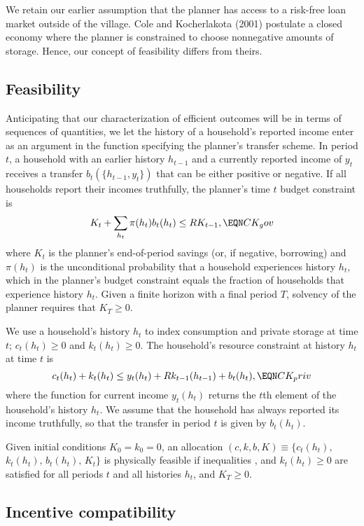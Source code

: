 We retain our earlier assumption that the planner
has access to a risk-free loan market outside of the village.
Cole and Kocherlakota (2001) postulate a closed economy where the planner
is constrained to choose nonnegative amounts of storage.
Hence, our concept of feasibility  differs from theirs.



\subsection{Feasibility}

Anticipating that our characterization of efficient outcomes will
be in terms of sequences of quantities, we let the history of
a household's reported income enter as an argument in the
function specifying the planner's transfer scheme.
In period $t$, a household with an earlier
history $h_{t-1}$ and a currently reported income of
$y_t$ receives a transfer  $b_t(\{h_{t-1},y_t\})$ that can
be either positive or negative. If all households report their
incomes truthfully, the planner's time $t$ budget constraint is
$$
K_t + \sum_{h_t} \pi(h_t) b_t(h_t) \leq R K_{t-1},  \EQN CK_gov
$$
where $K_t$ is the planner's end-of-period savings (or, if
negative, borrowing) and
$\pi(h_t)$ is the unconditional probability that a household
experiences history $h_t$, which in the planner's budget
constraint equals the fraction of  households that
experience history $h_t$. Given a finite horizon with a final
period $T$, solvency of the planner requires that $K_T\geq 0$.

We use a household's history $h_t$ to index consumption
and private storage at time $t$; $c_t(h_t)\geq 0$ and $k_t(h_t)\geq 0$. The
household's resource constraint at history $h_t$ at  time $t$  is
$$
c_t(h_t) + k_t(h_t) \leq y_t(h_t) + R k_{t-1}(h_{t-1}) + b_t(h_t), \EQN CK_priv
$$
where the function for current income $y_t(h_t)$ returns the $t$th
element of the household's history $h_t$. We assume that the
household has always reported its income truthfully, so that the transfer
in period $t$ is given by $b_t(h_t)$.

Given initial conditions $K_0=k_0=0$, an allocation
$(c,k,b,K)\equiv\{c_t(h_t),$\hfil$k_t(h_t),\, b_t(h_t),\,K_t\}$
is physically feasible if inequalities ,  and $k_t(h_t)\geq 0$
are satisfied for all periods $t$ and all histories $h_t$, and $K_T \geq 0$.


\subsection{Incentive compatibility}

